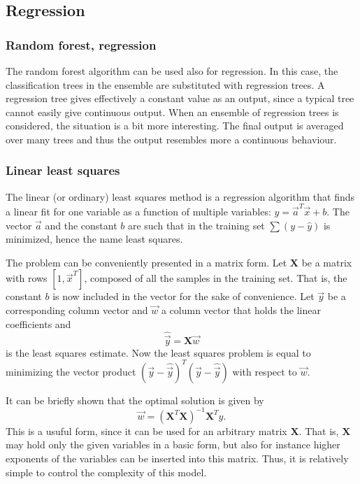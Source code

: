 \documentclass[twoside]{article}
\renewcommand{\v}[1]{\vec{#1}}
\begin{document}
\begin{multicols}{2}
\subsection{Regression}

\subsubsection{Random forest, regression}

The random forest algorithm can be used also for regression. In this case, the classification trees in the 
ensemble are substituted with regression trees. A regression tree gives effectively a constant value as an output,
since a typical tree cannot easily give continuous output. When an ensemble of regression trees is considered, the 
situation is a bit more interesting. The final output is averaged over many trees and thus the output resembles
more a continuous behaviour.

\subsubsection{Linear least squares}

The linear (or ordinary) least squares method is a regression algorithm that
finds a linear fit for one variable as a function of multiple variables: $\hat{y} = \v{a}^T \v{x}+b$. 
The vector $\v{a}$ and the constant $b$ are such that in the training set $\sum (y - \hat{y})$ is 
minimized, hence the name least squares.

The problem can be conveniently presented in a matrix form. Let $\mathbf{X}$ be a matrix
with rows $[1, \v{x}^T]$, composed of all the samples in the training set. That is, the 
constant $b$ is now included in the vector for the sake of convenience. Let $\v{y}$ be
a corresponding column vector and $\v{w}$ a column vector that holds the linear coefficients and
\begin{equation}
\hat{\v{y}} = \mathbf{X} \v{w}
\end{equation}
is the least squares estimate. Now the least squares problem is equal to minimizing the
vector product $(\v{y} - \hat{\v{y}})^T(\v{y} - \hat{\v{y}})$ with respect to $\v{w}$. 

It can be briefly shown that the optimal solution is given by 
\begin{equation}
 \v{w} = (\mathbf{X}^T \mathbf{X})^{-1} \mathbf{X}^T y.
\end{equation}
This is a usuful form, since it can be used for an arbitrary matrix $\mathbf{X}$. That is,
$\mathbf{X}$ may hold only the given variables in a basic form, but also for instance higher
exponents of the variables can be inserted into this matrix. Thus, it is relatively simple
to control the complexity of this model.


\end{multicols}
\end{document}
